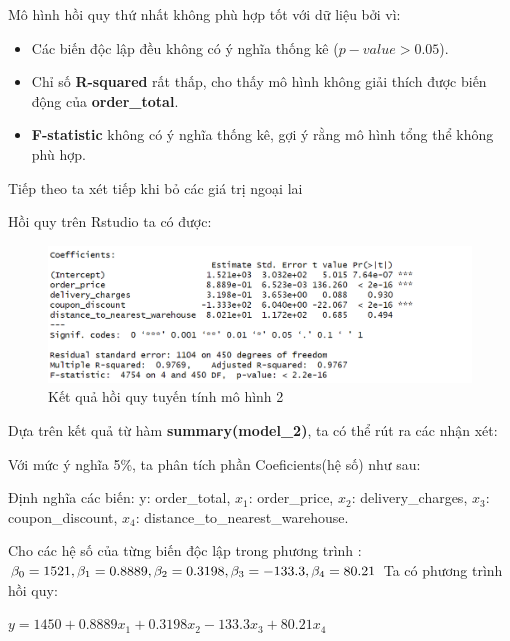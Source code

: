 Mô hình hồi quy thứ nhất không phù hợp tốt với dữ liệu bởi vì:
\begin{itemize}
\item Các biến độc lập đều không có ý nghĩa thống kê ($p-value > 0.05$).
\item Chỉ số \textbf{R-squared} rất thấp, cho thấy mô hình không giải thích được biến động của \textbf{order\_total}.
\item\textbf{F-statistic} không có ý nghĩa thống kê, gợi ý rằng mô hình tổng thể không phù hợp.
\end{itemize}

Tiếp theo ta xét tiếp khi bỏ các giá trị ngoại lai

Hồi quy trên Rstudio ta có được:
\begin{figure}[H]
  \centering
  \includegraphics[width=0.7\linewidth]{graphics/5.5.3.png}
  \caption{Kết quả hồi quy tuyến tính mô hình 2 }
\end{figure} 

Dựa trên kết quả từ hàm \textbf{summary(model\_2)}, ta có thể rút ra các nhận xét:

Với mức ý nghĩa 5\%, ta phân tích phần Coeficients(hệ số) như sau:

Định nghĩa các biến:  y: order\_total, $x_1$: order\_price, $x_2$: delivery\_charges, $x_3$: coupon\_discount, $x_4$: distance\_to\_nearest\_warehouse.

Cho các hệ số của từng biến độc lập trong phương trình : $\beta_0= 1521, \beta_1= 0.8889, \\\beta_2= 0.3198, \beta_3= -133.3, \beta_4= 80.21$ Ta có phương trình hồi quy: 

 \hspace{25mm}$y= 1450 + 0.8889x_1 + 0.3198x_2 - 133.3x_3 + 80.21x_4$


